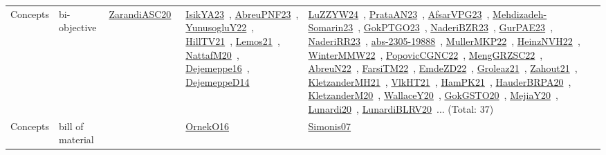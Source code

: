 {\begin{longtable}{lp{3cm}>{\raggedright\arraybackslash}p{6cm}>{\raggedright\arraybackslash}p{6cm}>{\raggedright\arraybackslash}p{8cm}}
Concepts & bi-objective & \href{../works/ZarandiASC20.pdf}{ZarandiASC20}~\cite{ZarandiASC20} & \href{../works/IsikYA23.pdf}{IsikYA23}~\cite{IsikYA23}, \href{../works/AbreuPNF23.pdf}{AbreuPNF23}~\cite{AbreuPNF23}, \href{../works/YunusogluY22.pdf}{YunusogluY22}~\cite{YunusogluY22}, \href{../works/HillTV21.pdf}{HillTV21}~\cite{HillTV21}, \href{../works/Lemos21.pdf}{Lemos21}~\cite{Lemos21}, \href{../works/NattafM20.pdf}{NattafM20}~\cite{NattafM20}, \href{../works/Dejemeppe16.pdf}{Dejemeppe16}~\cite{Dejemeppe16}, \href{../works/DejemeppeD14.pdf}{DejemeppeD14}~\cite{DejemeppeD14} & \href{../works/LuZZYW24.pdf}{LuZZYW24}~\cite{LuZZYW24}, \href{../works/PrataAN23.pdf}{PrataAN23}~\cite{PrataAN23}, \href{../works/AfsarVPG23.pdf}{AfsarVPG23}~\cite{AfsarVPG23}, \href{../works/Mehdizadeh-Somarin23.pdf}{Mehdizadeh-Somarin23}~\cite{Mehdizadeh-Somarin23}, \href{../works/GokPTGO23.pdf}{GokPTGO23}~\cite{GokPTGO23}, \href{../works/NaderiBZR23.pdf}{NaderiBZR23}~\cite{NaderiBZR23}, \href{../works/GurPAE23.pdf}{GurPAE23}~\cite{GurPAE23}, \href{../works/NaderiRR23.pdf}{NaderiRR23}~\cite{NaderiRR23}, \href{../works/abs-2305-19888.pdf}{abs-2305-19888}~\cite{abs-2305-19888}, \href{../works/MullerMKP22.pdf}{MullerMKP22}~\cite{MullerMKP22}, \href{../works/HeinzNVH22.pdf}{HeinzNVH22}~\cite{HeinzNVH22}, \href{../works/WinterMMW22.pdf}{WinterMMW22}~\cite{WinterMMW22}, \href{../works/PopovicCGNC22.pdf}{PopovicCGNC22}~\cite{PopovicCGNC22}, \href{../works/MengGRZSC22.pdf}{MengGRZSC22}~\cite{MengGRZSC22}, \href{../works/AbreuN22.pdf}{AbreuN22}~\cite{AbreuN22}, \href{../works/FarsiTM22.pdf}{FarsiTM22}~\cite{FarsiTM22}, \href{../works/EmdeZD22.pdf}{EmdeZD22}~\cite{EmdeZD22}, \href{../works/Groleaz21.pdf}{Groleaz21}~\cite{Groleaz21}, \href{../works/Zahout21.pdf}{Zahout21}~\cite{Zahout21}, \href{../works/KletzanderMH21.pdf}{KletzanderMH21}~\cite{KletzanderMH21}, \href{../works/VlkHT21.pdf}{VlkHT21}~\cite{VlkHT21}, \href{../works/HamPK21.pdf}{HamPK21}~\cite{HamPK21}, \href{../works/HauderBRPA20.pdf}{HauderBRPA20}~\cite{HauderBRPA20}, \href{../works/KletzanderM20.pdf}{KletzanderM20}~\cite{KletzanderM20}, \href{../works/WallaceY20.pdf}{WallaceY20}~\cite{WallaceY20}, \href{../works/GokGSTO20.pdf}{GokGSTO20}~\cite{GokGSTO20}, \href{../works/MejiaY20.pdf}{MejiaY20}~\cite{MejiaY20}, \href{../works/Lunardi20.pdf}{Lunardi20}~\cite{Lunardi20}, \href{../works/LunardiBLRV20.pdf}{LunardiBLRV20}~\cite{LunardiBLRV20}... (Total: 37)\\
Concepts & bill of material &  & \href{../works/OrnekO16.pdf}{OrnekO16}~\cite{OrnekO16} & \href{../works/Simonis07.pdf}{Simonis07}~\cite{Simonis07}\\

\end{longtable}}
